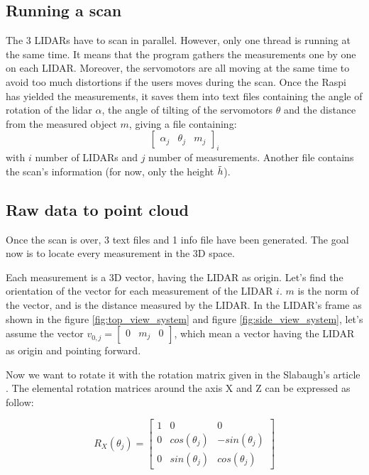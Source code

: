 \documentclass{article}
\newcommand{\vsp}{\vspace{\baselineskip}}
\begin{document}
\subsection{Running a scan}

The 3 LIDARs have to scan in parallel. However, only one thread is running at the same time. It means that the program gathers the measurements one by one on each LIDAR. Moreover, the servomotors are all moving at the same time to avoid too much distortions if the users moves during the scan. Once the Raspi has yielded the measurements, it saves them into text files containing the angle of rotation of the lidar $\alpha$, the angle of tilting of the servomotors $\theta$ and the distance from the measured object $m$, giving a file containing: 
$$ 
\begin{bmatrix}
    \alpha_{j} & \theta_{j} & m_{j} 
\end{bmatrix}_i
$$
with $i$ number of LIDARs and $j$ number of measurements. Another file contains the scan's information (for now, only the height $\Tilde{h}$). 


\subsection{Raw data to point cloud}

Once the scan is over, 3 text files and 1 info file have been generated. The goal now is to locate every measurement in the 3D space.

\vsp

Each measurement is a 3D vector, having the LIDAR as origin. Let's find the orientation of the vector for each measurement of the LIDAR $i$. $m$ is the norm of the vector, and is the distance measured by the LIDAR. In the LIDAR's frame as shown in the figure \ref{fig:top_view_system} and figure \ref{fig:side_view_system}, let's assume the vector $v_{0,j} = 
\begin{bmatrix}
0 & m_j & 0 
\end{bmatrix}$, which mean a vector having the LIDAR as origin and pointing forward.

\vsp

Now we want to rotate it with the rotation matrix given in the Slabaugh's article \cite{rot_mat_euler}. The elemental rotation matrices around the axis X and Z can be expressed as follow:

\begin{equation}
\label{eq:rot_mat_x}
    R_X(\theta_j) = 
    \begin{bmatrix}
        1 & 0 & 0 \\
        0 & cos(\theta_j) & -sin(\theta_j) \\
        0 & sin(\theta_j) & cos(\theta_j)
    \end{bmatrix}
\end{equation}
\end{document}
